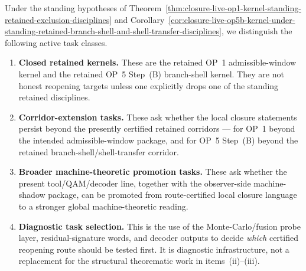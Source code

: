 \begin{definition}
\label{def:certified-post-closure-task-classes-after-retained-op-kernel-closures}
Under the standing hypotheses of Theorem~\ref{thm:closure-live-op1-kernel-standing-retained-exclusion-disciplines} and Corollary~\ref{cor:closure-live-op5b-kernel-under-standing-retained-branch-shell-and-shell-transfer-disciplines}, we distinguish the following active task classes.
\begin{enumerate}[leftmargin=2em]
  \item \textbf{Closed retained kernels.} These are the retained OP~1 admissible-window kernel and the retained OP~5 Step~(B) branch-shell kernel. They are not honest reopening targets unless one explicitly drops one of the standing retained disciplines.
  \item \textbf{Corridor-extension tasks.} These ask whether the local closure statements persist beyond the presently certified retained corridors --- for OP~1 beyond the intended admissible-window package, and for OP~5 Step~(B) beyond the retained branch-shell/shell-transfer corridor.
  \item \textbf{Broader machine-theoretic promotion tasks.} These ask whether the present tool/QAM/decoder line, together with the observer-side machine-shadow package, can be promoted from route-certified local closure language to a stronger global machine-theoretic reading.
  \item \textbf{Diagnostic task selection.} This is the use of the Monte-Carlo/fusion probe layer, residual-signature words, and decoder outputs to decide \emph{which} certified reopening route should be tested first. It is diagnostic infrastructure, not a replacement for the structural theorematic work in items~(ii)--(iii).
\end{enumerate}
\end{definition}

